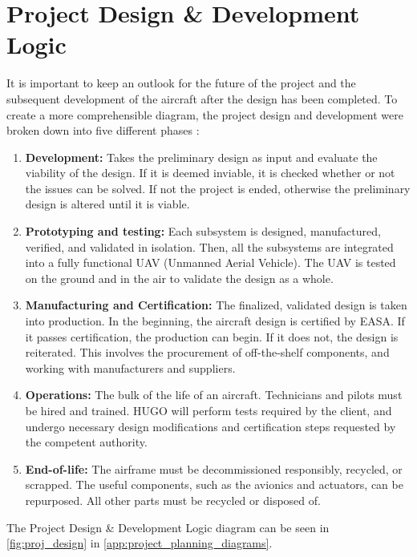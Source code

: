 \section{Project Design \& Development Logic }
\label{sec:Project Design Development Logic}
It is important to keep an outlook for the future of the project and the subsequent development of the aircraft after the design has been completed. To create a more comprehensible diagram, the project design and development were broken down into five different phases \cite{Spitz2001}: 

\begin{enumerate}
    \item \textbf{Development:} Takes the preliminary design as input and evaluate the viability of the design. If it is deemed inviable, it is checked whether or not the issues can be solved. If not the project is ended, otherwise the preliminary design is altered until it is viable.   
    \item \textbf{Prototyping and testing:} Each subsystem is designed, manufactured, verified, and validated in isolation. Then, all the subsystems are integrated into a fully functional UAV (Unmanned Aerial Vehicle). The UAV is tested on the ground and in the air to validate the design as a whole.
    \item \textbf{Manufacturing and Certification:} The finalized, validated design is taken into production. In the beginning, the aircraft design is certified by EASA. If it passes certification, the production can begin. If it does not, the design is reiterated. This involves the procurement of off-the-shelf components, and working with manufacturers and suppliers. 
    \item \textbf{Operations:} The bulk of the life of an aircraft. Technicians and pilots must be hired and trained. %
    HUGO will perform tests required by the client, and undergo necessary design modifications and certification steps requested by the competent authority.
    \item \textbf{End-of-life:} The airframe must be decommissioned responsibly, recycled, or scrapped. The useful components, such as the avionics and actuators, can be repurposed. All other parts must be recycled or disposed of.%
\end{enumerate}
The Project Design \& Development Logic diagram can be seen in \autoref{fig:proj_design} in \autoref{app:project_planning_diagrams}.

